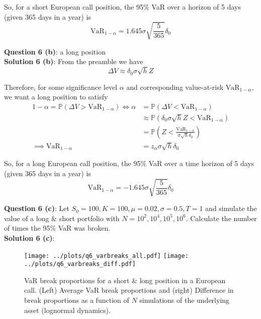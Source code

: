 \documentclass[12pt]{article}
\newlength\tindent
\renewcommand{\indent}{\hspace*{\tindent}}
\renewcommand{\P}{\mathbb P}
\begin{document}
\indent So, for a short European call position, the 95\% VaR over a horizon of 5 days (given 365 days in a year) is
\begin{equation*}
	\text{VaR}_{1 - \alpha} = 1.645  \sigma \sqrt{ \frac{5}{365} } \delta_0
\end{equation*}


{\bf Question 6 (b)}: a long position \\

{\bf Solution 6 (b)}: From the preamble we have
\begin{equation*}
	\Delta V \approx \delta_0\sigma\sqrt{h}Z
\end{equation*}

Therefore, for some significance level $\alpha$ and corresponding value-at-risk $\text{VaR}_{1 - \alpha}$, we want a long position to satisfy
\begin{align*}
	1 - \alpha = \P \left( \Delta V > \text{VaR}_{1 - \alpha} \right) \iff \alpha &= \P \left( \Delta V < \text{VaR}_{1 - \alpha} \right) \\
	&\approx \P \left( \delta_0\sigma\sqrt{h}Z < \text{VaR}_{1 - \alpha} \right) \\
	&= \P \left( Z < \frac{ \text{VaR}_{1 - \alpha} }{ \sigma\sqrt{h}\delta_0 } \right) \\
	\implies \text{VaR}_{1 - \alpha} &= z_{\alpha} \sigma \sqrt{h} \delta_0
\end{align*}

\indent So, for a long European call position, the 95\% VaR over a time horizon of 5 days (given  365 days in a year) is
\begin{equation*}
	\text{VaR}_{1 - \alpha} = -1.645  \sigma \sqrt{ \frac{5}{365} } \delta_0
\end{equation*}


\newpage
{\bf Question 6 (c)}: Let $S_0 = 100, K = 100, \mu = 0.02, \sigma = 0.5, T = 1$ and simulate the value of a long \& short portfolio with $N = 10^2, 10^4, 10^5, 10^6$. Calculate the number of times the 95\% VaR was broken. \\

{\bf Solution 6 (c)}: 

\begin{figure}[H]
	\centering
 	\texttt{[image: ../plots/q6\_varbreaks\_all.pdf]}
	\texttt{[image: ../plots/q6\_varbreaks\_diff.pdf]}
\caption{VaR break proportions for a short \& long position in a European call. (Left) Average VaR break proportions and (right) Difference in break proportions as a function of $N$ simulations of the underlying asset (lognormal dynamics).}
\label{fig:varbreaks}
\end{figure}
\end{document}

